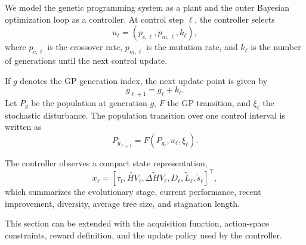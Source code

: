 We model the genetic programming system as a plant and the outer Bayesian
optimization loop as a controller. At control step $\ell$, the controller
selects
%
\begin{equation}
u_{\ell} = (p_{c,\ell}, p_{m,\ell}, k_{\ell}),
\end{equation}
%
where $p_{c,\ell}$ is the crossover rate, $p_{m,\ell}$ is the mutation
rate, and $k_{\ell}$ is the number of generations until the next control
update.

If $g$ denotes the GP generation index, the next update point is given by
%
\begin{equation}
g_{\ell+1} = g_{\ell} + k_{\ell}.
\end{equation}
%
Let $P_{g}$ be the population at generation $g$, $F$ the GP transition,
and $\xi_{\ell}$ the stochastic disturbance. The population transition over
one control interval is written as
%
\begin{equation}
P_{g_{\ell+1}} = F(P_{g_{\ell}}, u_{\ell}, \xi_{\ell}).
\end{equation}

The controller observes a compact state representation,
%
\begin{equation}
x_{\ell} =
\left[
\tau_{\ell},
\widetilde{HV}_{\ell},
\widetilde{\Delta HV}_{\ell},
D_{\ell},
\widetilde{L}_{\ell},
\widetilde{s}_{\ell}
\right]^{\top},
\end{equation}
%
which summarizes the evolutionary stage, current performance, recent
improvement, diversity, average tree size, and stagnation length.

This section can be extended with the acquisition function, action-space
constraints, reward definition, and the update policy used by the
controller.

